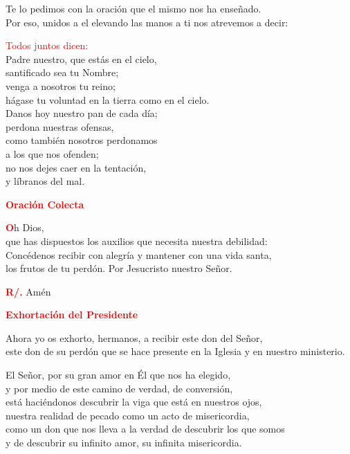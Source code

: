 \documentclass[12pt, letterpaper]{report}
\begin{document}
\newpage

\noindent
\Large {Te lo pedimos con la oraci\'on que el mismo nos ha ense\~nado.\\
Por eso, unidos a el elevando las manos a ti nos atrevemos a decir:}

\large {\textcolor{red}{Todos juntos dicen:}}\\
\Large {Padre nuestro, que est\'as en el cielo,\\
santificado sea tu Nombre;\\
venga a nosotros tu reino;\\
h\'agase tu voluntad en la tierra como en el cielo.\\
Danos hoy nuestro pan de cada d\'ia;\\
perdona nuestras ofensas,\\
como tambi\'en nosotros perdonamos\\
a los que nos ofenden;\\
no nos dejes caer en la tentaci\'on,\\
y l\'ibranos del mal.}

\Large {\bfseries \textcolor{red}{Oraci\'on Colecta}}

\lettrine[lines=2]{\bfseries \textcolor{red}{O}}{}\Large {h Dios,\\
que has dispuestos los auxilios que necesita nuestra debilidad:\\
Conc\'edenos recibir con alegr\'ia y mantener con una vida santa,\\
los frutos de tu perd\'on. Por Jesucristo nuestro Se\~nor.
}

\noindent
\Large {\bfseries \textcolor{red}{R/.}} \hspace{0.5cm} \Large {Am\'en}

\Large {\bfseries \textcolor{red}{Exhortaci\'on del Presidente}}

\noindent
\Large {Ahora yo os exhorto, hermanos, a recibir este don del Se\~nor,\\
este don de su perd\'on que se hace presente en la Iglesia y en nuestro ministerio.}

\noindent
\Large {El Se\~nor, por su gran amor en \'El que nos ha elegido,\\
y por medio de este camino de verdad, de conversi\'on,\\
est\'a haci\'endonos descubrir la viga que est\'a en nuestros ojos,\\
nuestra realidad de pecado como un acto de misericordia,\\
como un don que nos lleva a la verdad de descubrir los que somos\\
y de descubrir su infinito amor, su infinita misericordia.}
\end{document}
